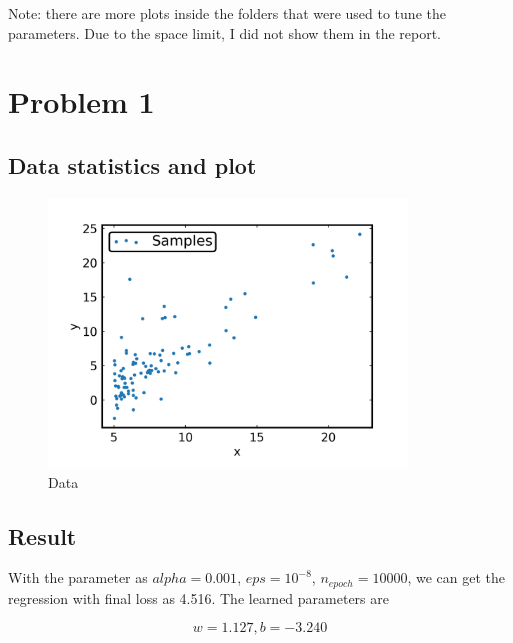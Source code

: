 Note: there are more plots inside the folders that were used to tune the parameters. Due to the space limit, I did not show them in the report.

\section{Problem 1}

\subsection{Data statistics and plot}

\begin{figure}[H]
\centering
  \includegraphics[width=0.85\textwidth]{fig/prob1/data.png}
\centering 
\caption{Data}
\label{fig:data}
\end{figure}

\subsection{Result}

With the parameter as $alpha = 0.001$, $eps = 10^{-8}$, 
$n_{epoch} = 10000$, we can get the regression with final loss as 4.516. The learned parameters are 

\begin{equation}
w = 1.127, b = -3.240
\end{equation}

